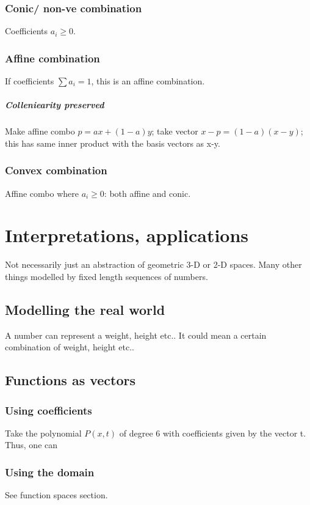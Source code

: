 \documentclass[oneside, article]{memoir}
\begin{document}
\subsection{Conic/ non-ve combination}
Coefficients $a_{i} \geq 0$.

\subsection{Affine combination}
If coefficients $\sum a_{i} = 1$, this is an affine combination.

\paragraph*{Colleniearity preserved}
Make affine combo $p = ax + (1-a)y$; take vector $x - p = (1-a)(x-y)$; this has same inner product with the basis vectors as x-y.

\subsection{Convex combination}
Affine combo where $a_{i} \geq 0$: both affine and conic.

\chapter{Interpretations, applications}
Not necessarily just an abstraction of geometric 3-D or 2-D spaces. Many other things modelled by fixed length sequences of numbers.

\section{Modelling the real world}
A number can represent a weight, height etc.. It could mean a certain combination of weight, height etc..

\section{Functions as vectors}
\subsection{Using coefficients}
Take the polynomial $P(x, t)$ of degree 6 with coefficients given by the vector t. Thus, one can 

\subsection{Using the domain}
See function spaces section.
\end{document}
